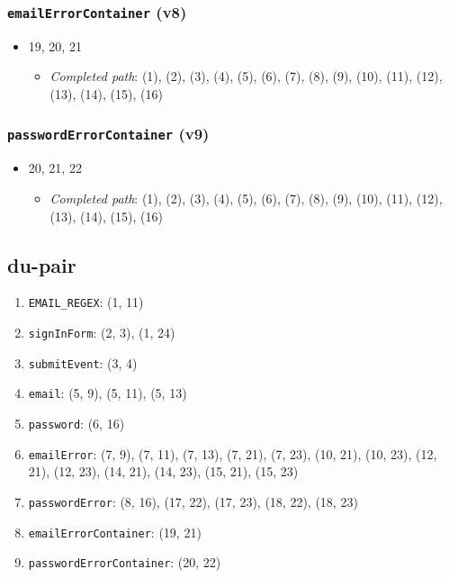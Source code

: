 \documentclass{article}
\newcommand{\completedpath}{\textit{Completed path}}
\begin{document}
\subsubsection*{\texttt{emailErrorContainer} (v8)}

\begin{itemize}
    \item 19, 20, 21
          \begin{itemize}
              \item \completedpath: (1), (2), (3), (4), (5), (6), (7), (8), (9), (10), (11), (12), (13), (14), (15), (16)
          \end{itemize}
\end{itemize}

\subsubsection*{\texttt{passwordErrorContainer} (v9)}

\begin{itemize}
    \item 20, 21, 22
          \begin{itemize}
              \item \completedpath: (1), (2), (3), (4), (5), (6), (7), (8), (9), (10), (11), (12), (13), (14), (15), (16)
          \end{itemize}
\end{itemize}

\subsection{du-pair}

\begin{enumerate}[label = (v\arabic*)]
    \item \texttt{EMAIL\_REGEX}: (1, 11)
    \item \texttt{signInForm}: (2, 3), (1, 24)
    \item \texttt{submitEvent}: (3, 4)
    \item \texttt{email}: (5, 9), (5, 11), (5, 13)
    \item \texttt{password}: (6, 16)
    \item \texttt{emailError}: (7, 9), (7, 11), (7, 13), (7, 21), (7, 23), (10, 21), (10, 23), (12, 21), (12, 23), (14, 21), (14, 23), (15, 21), (15, 23)
    \item \texttt{passwordError}: (8, 16), (17, 22), (17, 23), (18, 22), (18, 23)
    \item \texttt{emailErrorContainer}: (19, 21)
    \item \texttt{passwordErrorContainer}: (20, 22)
\end{enumerate}
\end{document}
